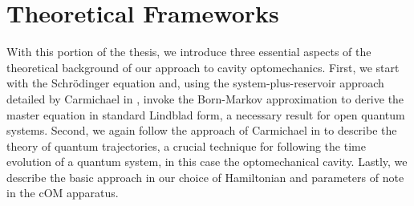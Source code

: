 \chapter{Theoretical Frameworks}
With this portion of the thesis, we introduce three essential aspects of the theoretical background of our approach to cavity optomechanics. First, we start with the Schr\"{o}dinger equation and, using the system-plus-reservoir approach detailed by Carmichael in \cite{howard1}, invoke the Born-Markov approximation to derive the master equation in standard Lindblad form, a necessary result for open quantum systems. Second, we again follow the approach of Carmichael in \cite{howard2} to describe the theory of quantum trajectories, a crucial technique for following the time evolution of a quantum system, in this case the optomechanical cavity. Lastly, we describe the basic approach in our choice of Hamiltonian and parameters of note in the cOM apparatus.

